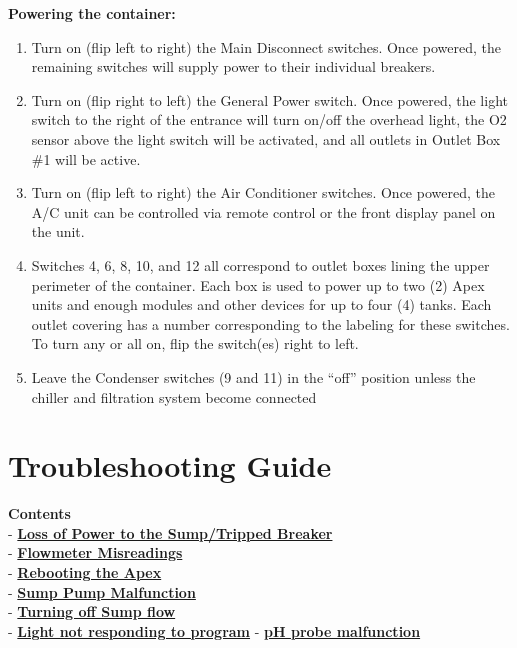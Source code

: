 \documentclass[]{book}
\providecommand{\tightlist}{%
  \setlength{\itemsep}{0pt}\setlength{\parskip}{0pt}}
\begin{document}
\textbf{Powering the container:}

\begin{enumerate}
\def\labelenumi{\arabic{enumi}.}
\tightlist
\item
  Turn on (flip left to right) the Main Disconnect switches. Once
  powered, the remaining switches will supply power to their individual
  breakers.
\item
  Turn on (flip right to left) the General Power switch. Once powered,
  the light switch to the right of the entrance will turn on/off the
  overhead light, the O2 sensor above the light switch will be
  activated, and all outlets in Outlet Box \#1 will be active.
\item
  Turn on (flip left to right) the Air Conditioner switches. Once
  powered, the A/C unit can be controlled via remote control or the
  front display panel on the unit.
\item
  Switches 4, 6, 8, 10, and 12 all correspond to outlet boxes lining the
  upper perimeter of the container. Each box is used to power up to two
  (2) Apex units and enough modules and other devices for up to four (4)
  tanks. Each outlet covering has a number corresponding to the labeling
  for these switches. To turn any or all on, flip the switch(es) right
  to left.
\item
  Leave the Condenser switches (9 and 11) in the ``off'' position unless
  the chiller and filtration system become connected
\end{enumerate}

\chapter{Troubleshooting Guide}\label{troubleshooting-guide}

\textbf{Contents}\\
- \protect\hyperlink{Tripped_Breaker}{\textbf{Loss of Power to the
Sump/Tripped Breaker}}\\
- \protect\hyperlink{Flowmeter_Misreadings}{\textbf{Flowmeter
Misreadings}}\\
- \protect\hyperlink{Reboot_Apex}{\textbf{Rebooting the Apex}}\\
- \protect\hyperlink{Sump_Pump_Malfunction}{\textbf{Sump Pump
Malfunction}}\\
- \protect\hyperlink{Turn_off_Sump_Flow}{\textbf{Turning off Sump
flow}}\\
- \protect\hyperlink{Light_OFF}{\textbf{Light not responding to
program}} - \protect\hyperlink{pH_Probe_Malfunction}{\textbf{pH probe
malfunction}}
\end{document}
